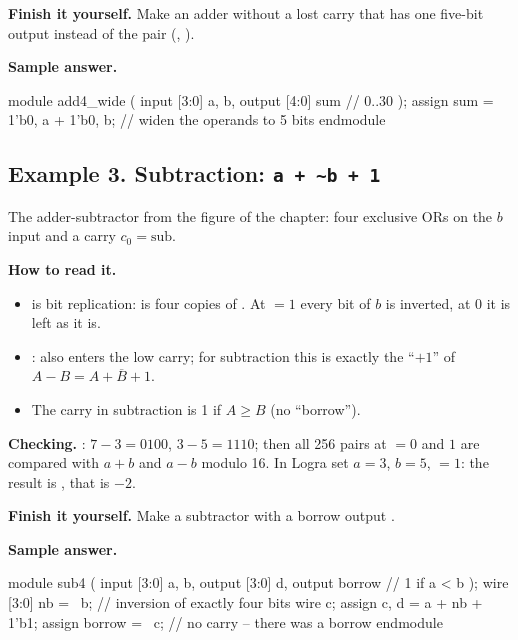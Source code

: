 \textbf{Finish it yourself.} Make an adder without a lost carry that has one
five-bit output instead of the pair (, ).

\textbf{Sample answer.}
\begin{vcode}
module add4_wide (
    input  [3:0] a, b,
    output [4:0] sum        // 0..30
);
    assign sum = {1'b0, a} + {1'b0, b};   // widen the operands to 5 bits
endmodule
\end{vcode}

\subsection{Example 3. Subtraction: \texttt{a + \textasciitilde b + 1}}

The adder-subtractor from the figure of the chapter: four exclusive ORs on the
$b$ input and a carry $c_0=\text{sub}$.


\textbf{How to read it.}
\begin{itemize}
  \item {} is bit replication:  is four copies of . At  $=1$ every bit of $b$ is inverted, at $0$ it is left as it is.
  \item {}:  also enters the low carry; for subtraction this is exactly the ``$+1$'' of $A-B=A+\overline B+1$.
  \item The carry  in subtraction is 1 if $A\ge B$ (no ``borrow'').
\end{itemize}
\textbf{Checking.} : $7-3=0100$, $3-5=1110$; then all 256
pairs at  $=0$ and $1$ are compared with $a+b$ and $a-b$ modulo 16. In
Logra set $a=3$, $b=5$,  $=1$: the result is , that is
$-2$.

\textbf{Finish it yourself.} Make a subtractor with a borrow output
.

\textbf{Sample answer.}
\begin{vcode}
module sub4 (
    input  [3:0] a, b,
    output [3:0] d,
    output       borrow       // 1 if a < b
);
    wire [3:0] nb = ~b;                  // inversion of exactly four bits
    wire       c;
    assign {c, d} = a + nb + 1'b1;
    assign borrow = ~c;                  // no carry -- there was a borrow
endmodule
\end{vcode}

